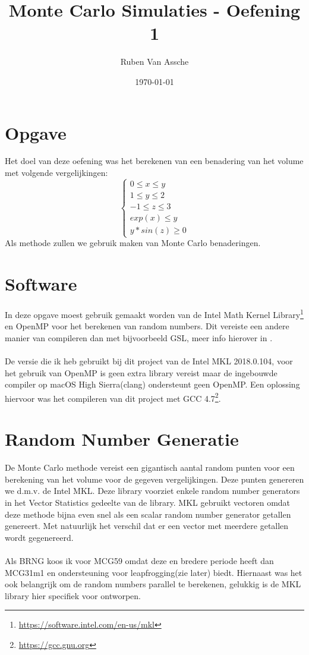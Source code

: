 \documentclass[10pt,a4paper,twocolumn]{article}
\author{Ruben Van Assche}
\title{Monte Carlo Simulaties - Oefening 1}
\date{\today}
\begin{document}
\maketitle
\section{Opgave}
Het doel van deze oefening was het berekenen van een benadering van het volume met volgende vergelijkingen:
$$
\left\{\begin{matrix}
0 \leq x \leq y\\ 
1 \leq y \leq 2\\ 
-1 \leq z \leq 3\\ 
exp(x) \leq y\\ 
y*sin(z) \geq 0
\end{matrix}\right.
$$ 
Als methode zullen we gebruik maken van Monte Carlo benaderingen.
\section{Software}
In deze opgave moest gebruik gemaakt worden van de Intel Math Kernel Library\footnote{\url{https://software.intel.com/en-us/mkl}} en OpenMP voor het berekenen van random numbers. Dit vereiste een andere manier van compileren dan met bijvoorbeeld GSL, meer info hierover in \texttt{}.
\\
\\
De versie die ik heb gebruikt bij dit project van de Intel MKL 2018.0.104, voor het gebruik van OpenMP is geen extra library vereist maar de ingebouwde compiler op macOS High Sierra(clang) ondersteunt geen OpenMP. Een oplossing hiervoor was het compileren van dit project met GCC 4.7\footnote{\url{https://gcc.gnu.org}}.
\section{Random Number Generatie}
De Monte Carlo methode vereist een gigantisch aantal random punten voor een berekening van het volume voor de gegeven vergelijkingen. Deze punten genereren we d.m.v. de Intel MKL. Deze library voorziet enkele random number generators in het Vector Statistics gedeelte van de library. MKL gebruikt vectoren omdat deze methode bijna even snel als een scalar random number generator getallen genereert. Met natuurlijk het verschil dat er een vector met meerdere getallen wordt gegenereerd.
\\
\\
Als BRNG koos ik voor MCG59 omdat deze en bredere periode heeft dan MCG31m1 en ondersteuning voor leapfrogging(zie later) biedt. Hiernaast was het ook belangrijk om de random numbers parallel te berekenen, gelukkig is de MKL library hier specifiek voor ontworpen.
\end{document}
